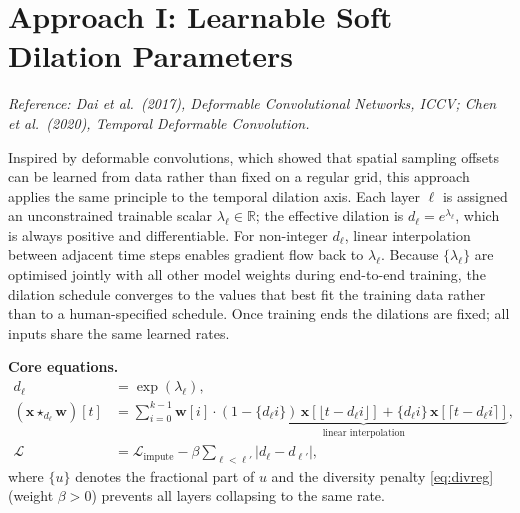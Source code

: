 \documentclass[12pt,a4paper]{article}
\newcommand{\xv}{\mathbf{x}}
\newcommand{\wv}{\mathbf{w}}
\begin{document}
\section{Approach I: Learnable Soft Dilation Parameters}

\noindent\textit{Reference: Dai et al.\ (2017), Deformable Convolutional
Networks, ICCV; Chen et al.\ (2020), Temporal Deformable Convolution.}

\medskip

Inspired by deformable convolutions, which showed that spatial sampling
offsets can be learned from data rather than fixed on a regular grid, this
approach applies the same principle to the temporal dilation axis. Each layer
$\ell$ is assigned an unconstrained trainable scalar $\lambda_\ell \in
\mathbb{R}$; the effective dilation is $d_\ell = e^{\lambda_\ell}$, which is
always positive and differentiable. For non-integer $d_\ell$, linear
interpolation between adjacent time steps enables gradient flow back to
$\lambda_\ell$. Because $\{\lambda_\ell\}$ are optimised jointly with all
other model weights during end-to-end training, the dilation schedule converges
to the values that best fit the training data rather than to a human-specified
schedule. Once training ends the dilations are fixed; all inputs share the same
learned rates.

\medskip

\noindent\textbf{Core equations.}
\begin{align}
  d_\ell &= \exp(\lambda_\ell), \label{eq:softd}\\
  (\xv \star_{d_\ell} \wv)[t]
    &= \sum_{i=0}^{k-1} \wv[i]\cdot
       \underbrace{(1{-}\{d_\ell i\})\,\xv[\lfloor t-d_\ell i\rfloor]
                  +\{d_\ell i\}\,\xv[\lceil t-d_\ell i\rceil]}_{\text{linear
                  interpolation}}, \label{eq:softconv}\\
  \mathcal{L} &= \mathcal{L}_{\text{impute}}
               - \beta\!\sum_{\ell<\ell'}\!|d_\ell - d_{\ell'}|,
               \label{eq:divreg}
\end{align}
where $\{u\}$ denotes the fractional part of $u$ and the diversity penalty
\cref{eq:divreg} (weight $\beta>0$) prevents all layers collapsing to the same
rate.
\end{document}
